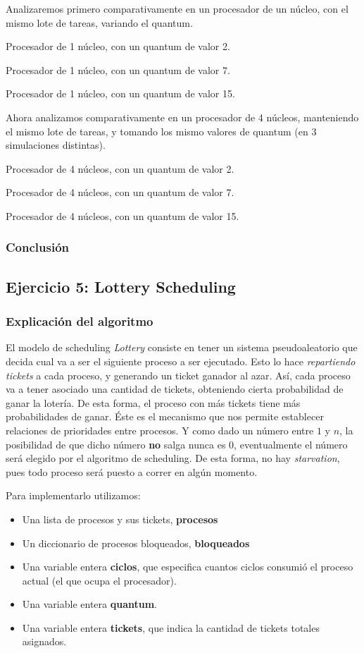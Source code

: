 \documentclass[a4paper]{article}
\begin{document}
Analizaremos primero comparativamente en un procesador de un núcleo, con el
mismo lote de tareas, variando el quantum.

Procesador de 1 núcleo, con un quantum de valor 2.

Procesador de 1 núcleo, con un quantum de valor 7.

Procesador de 1 núcleo, con un quantum de valor 15.

Ahora analizamos comparativamente en un procesador de 4 núcleos, manteniendo
el mismo lote de tareas, y tomando los mismo valores de quantum (en 3
simulaciones distintas).

Procesador de 4 núcleos, con un quantum de valor 2.

Procesador de 4 núcleos, con un quantum de valor 7.

Procesador de 4 núcleos, con un quantum de valor 15.

\subsubsection{Conclusión}

\subsection{Ejercicio 5: Lottery Scheduling}
\subsubsection{Explicación del algoritmo}
El modelo de scheduling \textit{Lottery} consiste en tener un sistema
pseudoaleatorio que decida cual va a ser el siguiente proceso a ser
ejecutado. Esto lo hace \textit{repartiendo tickets} a cada proceso, y
generando un ticket ganador al azar. Así, cada
proceso va a tener asociado una cantidad de tickets, obteniendo
cierta probabilidad de ganar la lotería. De esta forma, el proceso con más
tickets tiene más probabilidades de ganar. Éste es el mecanismo que nos
permite establecer relaciones de prioridades entre procesos.
Y como dado un número entre $1$ y $n$, la posibilidad de que dicho número
\textbf{no} salga nunca es $0$, eventualmente el número será elegido por el
algoritmo de scheduling. De esta forma, no hay \textit{starvation}, pues
todo proceso será puesto a correr en algún momento.

Para implementarlo utilizamos:
\begin{itemize}
\item Una lista de procesos y sus tickets, \textbf{procesos}
\item Un diccionario de procesos bloqueados, \textbf{bloqueados}
\item Una variable entera \textbf{ciclos}, que especifica cuantos ciclos
consumió el proceso actual (el que ocupa el procesador).
\item Una variable entera \textbf{quantum}.
\item Una variable entera \textbf{tickets}, que indica la cantidad de
tickets totales asignados.
\end{itemize}
\end{document}
